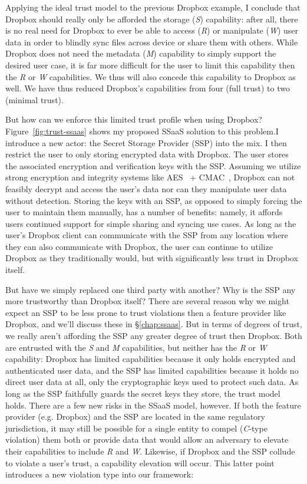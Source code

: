 Applying the ideal trust model to the previous Dropbox example, I
conclude that Dropbox should really only be afforded the storage
(\emph{S}) capability: after all, there is no real need for Dropbox to
ever be able to access (\emph{R}) or manipulate (\emph{W}) user data
in order to blindly sync files across device or share them with
others. While Dropbox does not need the metadata (\emph{M}) capability
to simply support the desired user case, it is far more difficult for
the user to limit this capability then the \emph{R} or \emph{W}
capabilities. We thus will also concede this capability to Dropbox as
well. We have thus reduced Dropbox's capabilities from four (full
trust) to two (minimal trust).

But how can we enforce this limited trust profile when using Dropbox?
Figure~\ref{fig:trust-ssaas} shows my proposed SSaaS solution to this
problem.I introduce a new actor: the Secret Storage Provider (SSP)
into the mix. I then restrict the user to only storing encrypted data
with Dropbox. The user stores the associated encryption and
verification keys with the SSP. Assuming we utilize strong encryption
and integrity systems like AES~\cite{nist2001} +
CMAC~\cite{dworkin2005}, Dropbox can not feasibly decrypt and access
the user's data nor can they manipulate user data without
detection. Storing the keys with an SSP, as opposed to simply forcing
the user to maintain them manually, has a number of benefits: namely,
it affords users continued support for simple sharing and syncing use
cases. As long as the user's Dropbox client can communicate with the
SSP from any location where they can also communicate with Dropbox,
the user can continue to utilize Dropbox as they traditionally would,
but with significantly less trust in Dropbox itself.

But have we simply replaced one third party with another? Why is the
SSP any more trustworthy than Dropbox itself? There are several reason
why we might expect an SSP to be less prone to trust violations then a
feature provider like Dropbox, and we'll discuss these in
\S\ref{chap:ssaas}. But in terms of degrees of trust, we really aren't
affording the SSP any greater degree of trust then Dropbox. Both are
entrusted with the \emph{S} and \emph{M} capabilities, but neither has
the \emph{R} or \emph{W} capability: Dropbox has limited capabilities
because it only holds encrypted and authenticated user data, and the
SSP has limited capabilities because it holds no direct user data at
all, only the cryptographic keys used to protect such data. As long as
the SSP faithfully guards the secret keys they store, the trust model
holds. There are a few new risks in the SSaaS model, however. If both
the feature provider (e.g. Dropbox) and the SSP are located in the
same regulatory jurisdiction, it may still be possible for a single
entity to compel (\emph{C}-type violation) them both or provide data
that would allow an adversary to elevate their capabilities to include
\emph{R} and \emph{W}. Likewise, if Dropbox and the SSP collude to
violate a user's trust, a capability elevation will occur. This latter
point introduces a new violation type into our framework:

